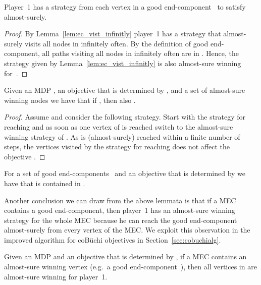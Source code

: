 \documentclass[11pt,letterpaper]{article}
\newcommand{\lu}{\textup{(}}
\newcommand{\ru}{\textup{)}\xspace}
\newcommand{\upbr}[1]{\lu #1\ru}
\begin{document}
\begin{lemma}\label{lem:wingood}
  Player~1 has a strategy  from each vertex in a good  end-component~
  to satisfy  almost-surely.
\end{lemma}
\begin{proof}
  By Lemma~\ref{lem:ec_vist_infinitly} player~1 has a strategy that almost-surely visits
  all nodes in  infinitely often. By the definition of good  end-component, 
  all paths visiting all nodes in  infinitely often are in .
  Hence, the strategy given by Lemma~\ref{lem:ec_vist_infinitly} is also almost-sure winning for~.
\end{proof}

\begin{lemma}\label{lem:reachwin}
  Given an MDP , an objective  that is determined by ,
  and a set  of almost-sure winning nodes we have that 
  if , then also .
\end{lemma}
\begin{proof}
 Assume  and consider the following strategy.
 Start with the strategy for reaching  and as soon as one vertex  of  is reached 
 switch to the almost-sure winning strategy of .
 As  is (almost-surely) reached within a finite number of steps, the vertices
 visited by the strategy for reaching  does not affect the objective .
\end{proof}

\begin{corollary}\label{cor:gecsound-gen}
  For a set of good end-components~ and an objective  that is determined by 
  we have that   is contained in .
\end{corollary}

Another conclusion we can draw from the above lemmata is that if a MEC contains
a good end-component, then player~1 has an almost-sure winning strategy
for the whole MEC because he can reach the good end-component almost-surely from 
every vertex of the MEC. We exploit this observation in the improved algorithm 
for coBüchi objectives in Section~\ref{sec:cobuchialg}.
\begin{corollary}\label{cor:winning_mec}
  Given an MDP  and an objective  that is determined by ,
  if a MEC  contains an almost-sure
  winning vertex \upbr{e.g.\ a good end-component~},
  then all vertices in  are almost-sure winning for player~1.
\end{corollary}
\end{document}
